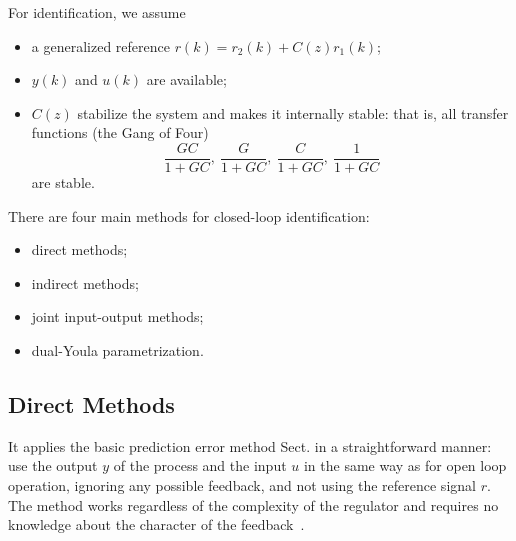 For identification, we assume
\begin{itemize}
\item a generalized reference $r(k) = r_2(k) + C(z)r_1(k)$;
\item $y(k)$ and $u(k)$ are available;
\item $C(z)$ stabilize the system and makes it internally stable: that is, all transfer functions (the Gang of Four)
\begin{equation*}
  \frac{GC}{1+GC},\ \frac{G}{1+GC},\ \frac{C}{1+GC},\ \frac{1}{1+GC}
\end{equation*}
are stable.
\end{itemize}

There are four main methods for closed-loop identification:
\begin{itemize}
\item direct methods;
\item indirect methods;
\item joint input-output methods;
\item dual-Youla parametrization.
\end{itemize}

\subsection{Direct Methods}
\label{sec:direct-methods}

It applies the basic prediction error method Sect. in a straightforward manner: use the output $y$ of the process and the input $u$ in the same way as for open loop operation, ignoring any possible feedback, and not using the reference signal $r$. The method works regardless of the complexity of the regulator and requires no knowledge about the character of the feedback~\cite{ljung}.

